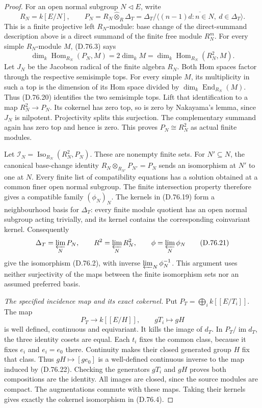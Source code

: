 \begin{proof}
For an open normal subgroup $N\triangleleft E$, write
\[
 R_N=k[E/N],\qquad
 P_N=R_N\widehat\otimes_R\Delta_T
     =\Delta_T/\overline{\langle(n-1)d:n\in N,\ d\in\Delta_T\rangle}.
                                                               \tag{D.76.19}
\]
This is a finite projective left $R_N$-module:
base change of the direct-summand description above
is a direct summand of the finite free module $R_N^m$.
For every simple $R_N$-module $M$, (D.76.3) says
\[
       \dim_k\operatorname{Hom}_{R_N}(P_N,M)
         =2\dim_k M
         =\dim_k\operatorname{Hom}_{R_N}(R_N^2,M).
                                                               \tag{D.76.20}
\]
Let $J_N$ be the Jacobson radical of the finite algebra
$R_N$. Both Hom spaces factor through the respective
semisimple tops. For every simple $M$, its multiplicity
in such a top is the dimension of its Hom space divided
by $\dim_k\operatorname{End}_{R_N}(M)$.
Thus (D.76.20) identifies the two semisimple tops.
Lift that identification to a map $R_N^2\to P_N$.
Its cokernel has zero top, so is zero by Nakayama's
lemma, since $J_N$ is nilpotent.
Projectivity splits this surjection. The complementary
summand again has zero top and hence is zero.
This proves
$P_N\cong R_N^2$ as actual finite modules.

Let $\mathcal I_N=\operatorname{Iso}_{R_N}(R_N^2,P_N)$.
These are nonempty finite sets.
For $N'\subseteq N$, the canonical base-change identity
$R_N\otimes_{R_{N'}}P_{N'}=P_N$ sends an isomorphism
at $N'$ to one at $N$.
Every finite list of compatibility equations has a
solution obtained at a common finer open normal subgroup.
The finite intersection property therefore gives a
compatible family $(\phi_N)_N$.
The kernels in (D.76.19) form a neighbourhood basis
for $\Delta_T$: every finite module quotient has an
open normal subgroup acting trivially, and its kernel
contains the corresponding coinvariant kernel.
Consequently
\[
   \Delta_T=\varprojlim_NP_N,\qquad
   R^2=\varprojlim_NR_N^2,\qquad
   \phi=\varprojlim_N\phi_N
                                                               \tag{D.76.21}
\]
give the isomorphism (D.76.2), with inverse
$\varprojlim_N\phi_N^{-1}$.
This argument uses neither surjectivity of the maps
between the finite isomorphism sets nor an assumed
preferred basis.

\emph{The specified incidence map and its exact cokernel.}
Put $P_T=\bigoplus_i k[[E/T_i]]$.
The map
\[
        P_T\longrightarrow k[[E/H]],\qquad
                           gT_i\longmapsto gH
                                                               \tag{D.76.22}
\]
is well defined, continuous and equivariant.
It kills the image of $d_T$.
In $P_T/\operatorname{im}d_T$, the three identity
cosets are equal. Each $t_i$ fixes the common class,
because it fixes $e_i$ and $e_i=e_0$ there.
Continuity makes their closed generated group $H$
fix that class. Thus
$gH\mapsto[g e_0]$ is a well-defined continuous inverse
to the map induced by (D.76.22).
Checking the generators $gT_i$ and $gH$ proves both
compositions are the identity.
All images are closed, since the source modules are
compact. The augmentations commute with these maps.
Taking their kernels gives exactly the cokernel
isomorphism in (D.76.4).


\end{proof}
